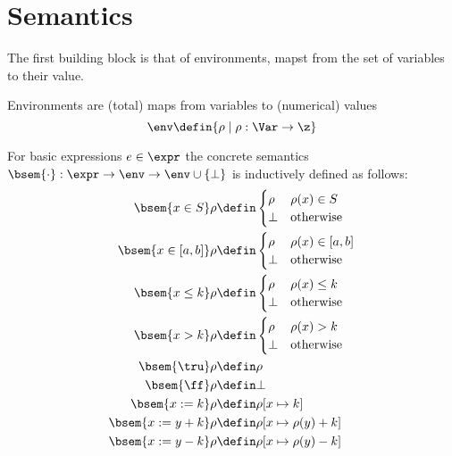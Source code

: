 \section{Semantics}

The first building block is that of environments, mapst from the set
of variables to their value.

\begin{definition}[Environments]
  Environments are (total) maps from variables to (numerical)
  values \[\env \defin \{\rho \mid \rho : \Var \to \z\}\]
\end{definition}

\begin{definition}
  For basic expressions \(e \in \expr\) the concrete semantics \(\bsem{
    \cdot} : \expr \to \env \to \env \cup \{\bot\}\) is inductively
  defined as follows:
  \begin{align*}
    \bsem{x\in S} \rho & \defin \begin{cases} \rho & \rho(x)\in S \\ \bot & \text{otherwise} \end{cases} \\
    \bsem{x\in [a,b]} \rho & \defin \begin{cases} \rho & \rho(x)\in [a,b] \\ \bot & \text{otherwise} \end{cases} \\
    \bsem{x \leq k} \rho & \defin \begin{cases} \rho & \rho(x)\leq k \\ \bot & \text{otherwise} \end{cases} \\
    \bsem{x > k} \rho & \defin \begin{cases} \rho & \rho(x) > k \\ \bot & \text{otherwise} \end{cases} \\
    \bsem{\tru} \rho & \defin \rho \\
    \bsem{\ff} \rho & \defin \bot \\
    \bsem{x := k} \rho & \defin \rho [x \mapsto k] \\
    \bsem{x := y + k} \rho & \defin \rho [x \mapsto \rho(y) + k] \\
    \bsem{x := y - k} \rho & \defin \rho [x \mapsto \rho(y) - k] \\
  \end{align*}
\end{definition}

